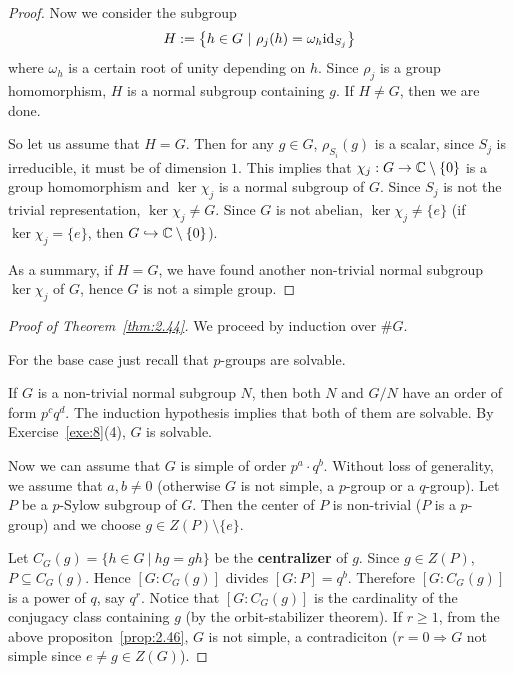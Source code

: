 \documentclass[twoside = false,	%
		headsepline,		%
		parskip = true,
		]{scrbook}						%
\begin{document}
\begin{proof}
        Now we consider the subgroup
        \begin{equation*}
            H:= \left\{ h \in G \ | \ \rho_j(h) = \omega_h \mathrm{id}_{S_j}\right\}
        \end{equation*}
        where $\omega_h$ is a certain root of unity depending on $h$. Since $\rho_j$ is a group homomorphism,
        $H$ is a normal subgroup containing $g$. If $H \neq G$, then we are done.

        So let us assume that $H=G$. Then for any $g \in G$, $\rho_{S_i}(g)$ is a scalar, since $S_j$ is irreducible, it must be of dimension $1$.
        This implies that $\chi_j: G \to \mathbb C \setminus \{0\}$ is a group homomorphism and $\ker \chi_j$ is a normal subgroup of $G$. Since $S_j$ is not the trivial representation, $\ker \chi_j \neq G$.
        Since $G$ is not abelian, $\ker \chi_j \neq \{e\}$ (if $\ker \chi_j = \{e\}$, then $G \hookrightarrow \mathbb C \setminus\{0\}$).

        As a summary, if $H=G$, we have found another non-trivial normal subgroup $\ker \chi_j$ of $G$, hence $G$ is not a simple group.
    \end{proof}

    \begin{proof}[Proof of Theorem~\ref{thm:2.44}]

        We proceed by induction over $\#G$.

        For the base case just recall that $p$-groups are solvable.

        If $G$ is a non-trivial normal subgroup $N$, then both $N$ and $G/N$ have an order of form $p^c q^d$. The induction hypothesis implies that both of them are solvable.
        By Exercise~\ref{exe:8}(4), $G$ is solvable.

        Now we can assume that $G$ is simple of order $p^a\cdot q^b$. Without loss of generality, we assume that $a,b \neq 0$ (otherwise $G$ is not simple, a $p$-group or a $q$-group).
        Let $P$ be a $p$-Sylow subgroup of $G$. Then the center of $P$ is non-trivial ($P$ is a $p$-group) and we choose $g \in Z(P) \setminus\{e\}$.

        Let $C_G(g) = \{h \in G \ | \ hg = gh\}$ be the \textbf{centralizer} of $g$. Since $g \in Z(P)$, $P \subseteq C_G(g)$.
        Hence $[G:C_G(g)]$ divides $[G:P] = q^b$. Therefore $[G:C_G(g)]$ is a power of $q$, say $q^r$. Notice that $[G:C_G(g)]$ is the cardinality of the conjugacy class containing $g$ (by the orbit-stabilizer theorem).
        If $r \geq 1$, from the above propositon~\ref{prop:2.46}, $G$ is not simple, a contradiciton ($r=0 \Rightarrow G$ not simple since $e \neq g \in Z(G)$).
    \end{proof}
\end{document}
